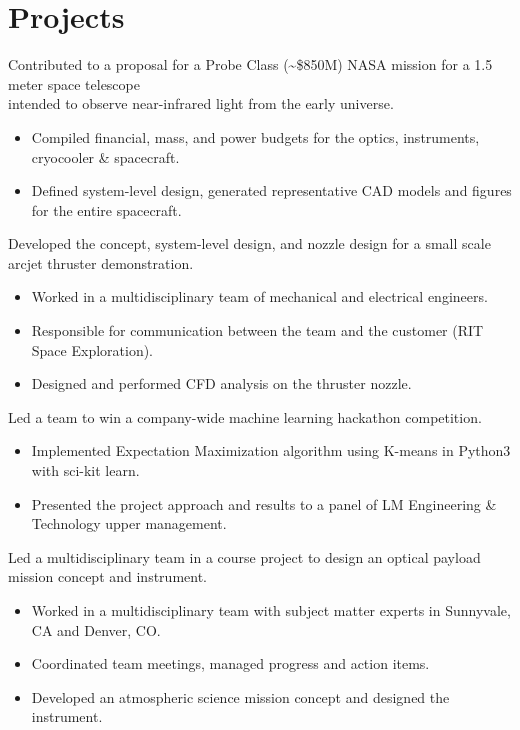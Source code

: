 \documentclass[10pt,final,sans]{resume}
\begin{document}
\section{Projects}
Contributed to a proposal for a Probe Class (\textasciitilde\$850M) NASA mission for a 1.5 meter space telescope \\
intended to observe near-infrared light from the early
universe.
\begin{itemize}
  \item Compiled financial, mass, and power budgets for the optics, instruments,
    cryocooler \& spacecraft.
  \item Defined system-level design, generated representative CAD models and
    figures for the entire spacecraft.
\end{itemize}

Developed the concept, system-level design, and nozzle design for a small scale arcjet thruster demonstration. 
\begin{itemize}
  \item Worked in a multidisciplinary team of mechanical and electrical engineers.
  \item Responsible for communication between the team and the customer (RIT Space Exploration).
  \item Designed and performed CFD analysis on the thruster nozzle.
\end{itemize}


Led a team to win a company-wide machine learning hackathon competition.
\begin{itemize}
  \item Implemented Expectation Maximization algorithm using K-means in Python3 with sci-kit learn.
  \item Presented the project approach and results to a panel of LM Engineering \& Technology upper management.
\end{itemize}

Led a multidisciplinary team in a course project to design an optical payload mission concept and instrument.
\begin{itemize}
  \item Worked in a multidisciplinary team with subject matter experts in Sunnyvale, CA and Denver, CO. 
  \item Coordinated team meetings, managed progress and action items.
  \item Developed an atmospheric science mission concept and designed the instrument.
\end{itemize}
\end{document}
